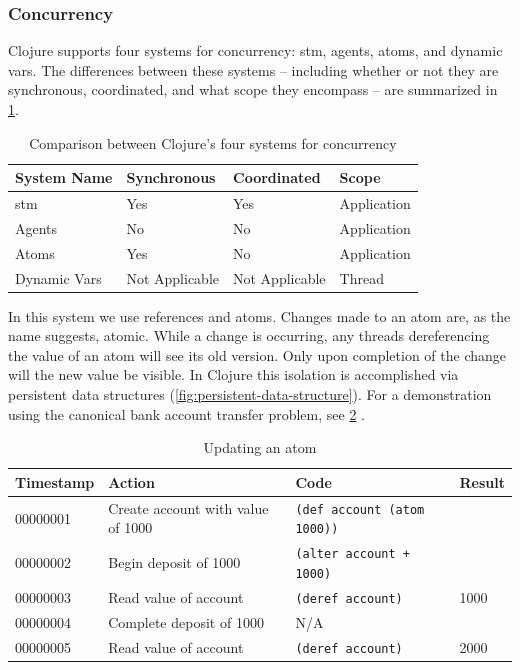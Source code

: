 		\subsubsection{Concurrency}
			Clojure supports four systems for concurrency:  \gls{stm}, agents, atoms, and dynamic vars.  The differences between these systems -- including whether or not they are synchronous, coordinated, and what scope they encompass -- are summarized in \cref{tbl:concurrency-system-comparison}.
			
			\begin{table}
				\centering
				
				\begin{tabular}{llll}
					\toprule
					System Name & Synchronous & Coordinated & Scope \\
					\midrule
					\gls{stm} & Yes & Yes & Application \\
					Agents & No & No & Application \\
					Atoms & Yes & No & Application \\
					Dynamic Vars & Not Applicable & Not Applicable & Thread \\
					\bottomrule
				\end{tabular}
				
				\caption{Comparison between Clojure's four systems for concurrency}
				\label{tbl:concurrency-system-comparison}
			\end{table}
			
			In this system we use references and atoms.  Changes made to an atom are, as the name suggests, atomic.  While a change is occurring, any threads dereferencing the value of an atom will see its old version.  Only upon completion of the change will the new value be visible.  In Clojure this isolation is accomplished via persistent data structures (\cref{fig:persistent-data-structure}).  For a demonstration using the canonical bank account transfer problem, see \cref{tbl:updating-an-atom} \cite{bank-problem}.
			
			\begin{table}
				\centering
				
				\begin{tabular}{llll}
					\toprule
					Timestamp & Action & Code & Result \\
					\midrule
					00000001 & Create account with value of 1000 & \texttt{(def account (atom 1000))} &  \\
					00000002 & Begin deposit of 1000 & \texttt{(alter account + 1000)} &  \\
					00000003 & Read value of account & \texttt{(deref account)} & 1000 \\
					00000004 & Complete deposit of 1000 & N/A &  \\
					00000005 & Read value of account & \texttt{(deref account)} & 2000 \\
					\bottomrule
				\end{tabular}
				
				\caption{Updating an atom}
				\label{tbl:updating-an-atom}
			\end{table}
			
